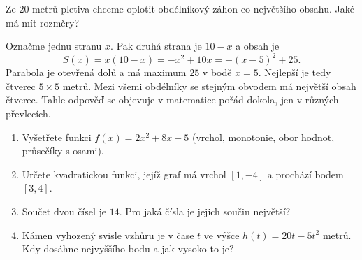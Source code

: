 \begin{example}
  Ze $20$ metrů pletiva chceme oplotit obdélníkový záhon co největšího obsahu. Jaké má mít rozměry?

  Označme jednu stranu $x$. Pak druhá strana je $10 - x$ a obsah je
  \begin{equation*}
    S(x) = x(10 - x) = -x^2 + 10x = -{(x - 5)}^2 + 25.
  \end{equation*}
  Parabola je otevřená dolů a má maximum $25$ v bodě $x = 5$. Nejlepší je tedy čtverec $5\times 5$ metrů. Mezi všemi obdélníky se stejným obvodem má největší obsah čtverec. Tahle odpověď se objevuje v matematice pořád dokola, jen v různých převlecích.

  \begin{center}
  \end{center}
\end{example}

\begin{problem}
  \begin{enumerate}[label=(\alph*)]
    \item Vyšetřete funkci $f(x) = 2x^2 + 8x + 5$ (vrchol, monotonie, obor hodnot, průsečíky s osami).
    \item Určete kvadratickou funkci, jejíž graf má vrchol $[1, -4]$ a prochází bodem $[3, 4]$.
    \item Součet dvou čísel je $14$. Pro jaká čísla je jejich součin největší?
    \item Kámen vyhozený svisle vzhůru je v čase $t$ ve výšce $h(t) = 20t - 5t^2$ metrů. Kdy dosáhne nejvyššího bodu a jak vysoko to je?
  \end{enumerate}
\end{problem}

